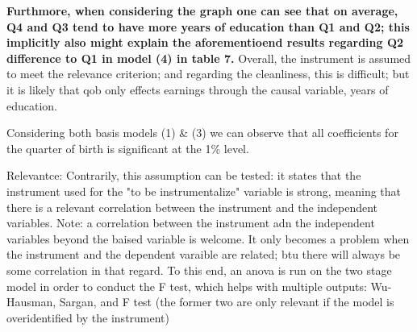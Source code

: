 \documentclass[a4paper]{article}
\begin{document}
\textbf{Furthmore, when considering the graph one can see that on average, Q4 and Q3 tend to have more years of education than Q1 and Q2; this implicitly also might explain the aforementioend results regarding Q2 difference to Q1 in model (4) in table 7.}
Overall, the instrument is assumed to meet the relevance criterion; and regarding the cleanliness, this is difficult; but it is likely that qob only effects earnings through the causal variable, years of education.





Considering both basis models (1) \& (3) we can observe that all coefficients for the quarter of birth is significant at the 1\% level. 






Relevantce: Contrarily, this assumption can be tested: it states that the instrument used for the "to be instrumentalize" variable is strong, meaning that there is a relevant correlation between the instrument and the independent variables. Note: a correlation between the instrument adn the independent variables beyond the baised variable is welcome. It only becomes a problem when the instrument and the dependent varaible are related; btu there will always be some correlation in that regard. To this end, an anova is run on the two stage model in order to conduct the F test, which helps with multiple outputs: Wu-Hausman, Sargan, and F test (the former two are only relevant if the model is overidentified by the instrument)
\end{document}
